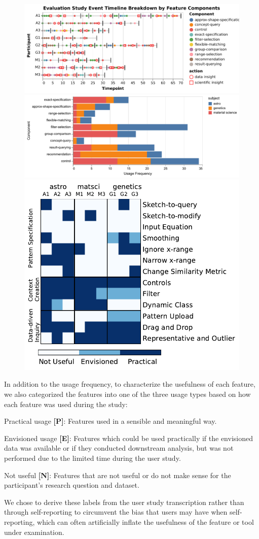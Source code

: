 \begin{figure}[ht!]
    \centering
    \includegraphics[width=0.4\linewidth]{figures/evalstudytimeline.pdf}
    \includegraphics[width=0.3\linewidth]{figures/usagefreqbysubject.pdf}
    \includegraphics[width=0.25\linewidth]{figures/PENcoding.pdf}


\end{figure}
\par In addition to the usage frequency, to characterize the usefulness of each feature, we also categorized the features into one of the three usage types based on how each feature was used during the study:
\begin{denselist}
    \item Practical usage \textbf{[P]}: Features used in a sensible and meaningful way.
    \item Envisioned usage \textbf{[E]}: Features which could be used practically if the envisioned data was available or if they conducted downstream analysis, but was not performed due to the limited time during the user study.
    \item Not useful \textbf{[N]}: Features that are not useful or do not make sense for the participant's research question and dataset.
\end{denselist}
We chose to derive these labels from the user study transcription rather than through self-reporting to circumvent the bias that users may have when self-reporting, which can often artificially inflate the usefulness of the feature or tool under examination.


